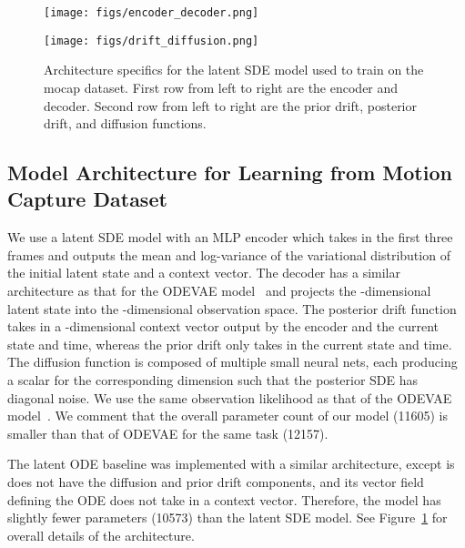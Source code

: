 \documentclass[twoside]{article}
\begin{document}
\begin{figure}[ht]
\begin{minipage}[t]{\linewidth}
\centering
{\texttt{[image: figs/encoder\_decoder.png]}}
\\ \vspace{-0.10cm}
\end{minipage}
\begin{minipage}[t]{\linewidth}
\centering
\texttt{[image: figs/drift\_diffusion.png]}
\\ \vspace{-0.10cm}
\end{minipage}
\caption{
Architecture specifics for the latent SDE model used to train on the mocap dataset.
First row from left to right are the encoder and decoder. 
Second row from left to right are the prior drift, posterior drift, and diffusion functions.
}
\label{fig:architecture}
\end{figure}

\subsection{Model Architecture for Learning from Motion Capture Dataset}\label{app:architecture}
We use a latent SDE model with an MLP encoder which takes in the first three frames and outputs the mean and log-variance of the variational distribution of the initial latent state and a context vector. 
The decoder has a similar architecture as that for the ODEVAE model~\cite{yildiz2019ode} and projects the -dimensional latent state into the -dimensional observation space. 
The posterior drift function takes in a -dimensional context vector output by the encoder and the current state and time, whereas the prior drift only takes in the current state and time. 
The diffusion function is composed of multiple small neural nets, each producing a scalar for the corresponding dimension such that the posterior SDE has diagonal noise. 
We use the same observation likelihood as that of the ODEVAE model~\cite{yildiz2019ode}.
We comment that the overall parameter count of our model (11605) is smaller than that of ODEVAE for the same task (12157).

The latent ODE baseline was implemented with a similar architecture, except is does not have the diffusion and prior drift components, and its vector field defining the ODE does not take in a context vector. Therefore, the model has slightly fewer parameters (10573) than the latent SDE model. See Figure~\ref{fig:architecture} for overall details of the architecture.
\end{document}
